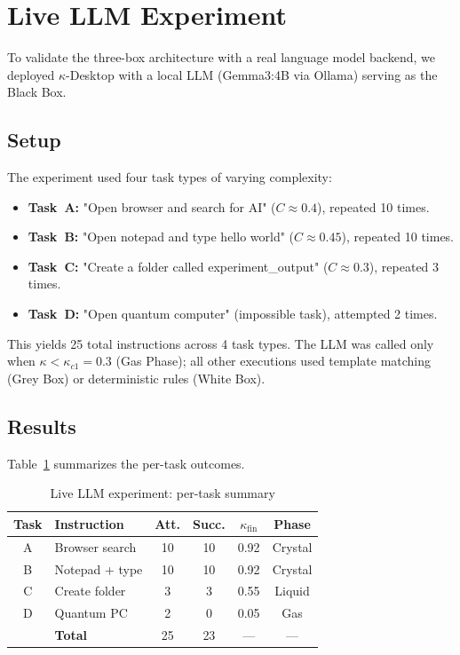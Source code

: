\documentclass[10pt,twocolumn]{article}
\begin{document}
\vspace{1cm}

\section{Live LLM Experiment}
\label{sec:llm}

To validate the three-box architecture with a real
language model backend, we deployed $\kappa$-Desktop
with a local LLM (Gemma3:4B via Ollama) serving as the
Black Box.

\subsection{Setup}

The experiment used four task types of varying
complexity:

\begin{itemize}
  \item \textbf{Task~A:} "Open browser and search for
    AI" ($C \approx 0.4$), repeated 10 times.
  \item \textbf{Task~B:} "Open notepad and type hello
    world" ($C \approx 0.45$), repeated 10 times.
  \item \textbf{Task~C:} "Create a folder called
    experiment\_output" ($C \approx 0.3$), repeated
    3 times.
  \item \textbf{Task~D:} "Open quantum computer"
    (impossible task), attempted 2 times.
\end{itemize}

\noindent This yields 25 total instructions across 4
task types. The LLM was called only when
$\kappa < \kappa_{c1} = 0.3$ (Gas Phase); all other
executions used template matching (Grey Box) or
deterministic rules (White Box).

\subsection{Results}

Table~\ref{tab:llm_summary} summarizes the per-task
outcomes.

\begin{table}[H]
\centering
\caption{Live LLM experiment: per-task summary}
\label{tab:llm_summary}
\small
\setlength{\tabcolsep}{4pt}
\begin{tabular}{clcccc}
\toprule
Task & Instruction & Att. & Succ. &
  $\kappa_{\mathrm{fin}}$ & Phase \\
\midrule
A & Browser search   & 10 & 10 & 0.92 & Crystal \\
B & Notepad + type   & 10 & 10 & 0.92 & Crystal \\
C & Create folder    & 3  & 3  & 0.55 & Liquid \\
D & Quantum PC       & 2  & 0  & 0.05 & Gas \\
\midrule
  & \textbf{Total}   & 25 & 23 & ---  & --- \\
\bottomrule
\end{tabular}
\end{table}
\end{document}
